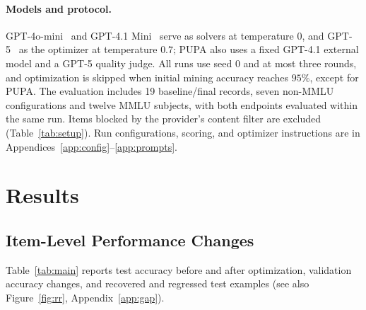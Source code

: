 \documentclass[11pt]{article}
\begin{document}
\paragraph{Models and protocol.}
GPT-4o-mini~\citep{openai2024gpt4o} and GPT-4.1 Mini~\citep{openai2025gpt41} serve as solvers at temperature $0$, and GPT-5~\citep{openai2025gpt5} as the optimizer at temperature $0.7$; PUPA also uses a fixed GPT-4.1 external model and a GPT-5 quality judge. All runs use seed $0$ and at most three rounds, and optimization is skipped when initial mining accuracy reaches $95\%$, except for PUPA. The evaluation includes 19 baseline/final records, seven non-MMLU configurations and twelve MMLU subjects, with both endpoints evaluated within the same run. Items blocked by the provider's content filter are excluded (Table~\ref{tab:setup}). Run configurations, scoring, and optimizer instructions are in Appendices~\ref{app:config}--\ref{app:prompts}.

\section{Results}
\label{sec:results}

\subsection{Item-Level Performance Changes}
\label{sec:itemresults}

Table~\ref{tab:main} reports test accuracy before and after optimization, validation accuracy changes, and recovered and regressed test examples (see also Figure~\ref{fig:rr}, Appendix~\ref{app:gap}).
\end{document}
